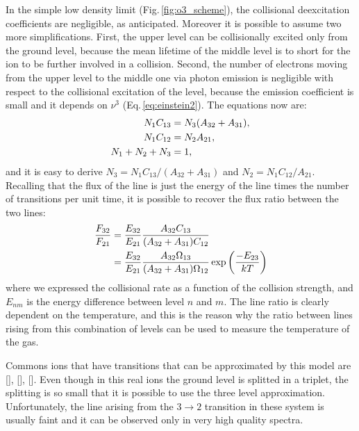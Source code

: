 \documentclass[../thesis.tex]{subfiles}
\begin{document}
In the simple low density limit (Fig.\,\ref{fig:o3_scheme}), the collisional deexcitation coefficients are negligible, as anticipated.
Moreover it is possible to assume two more simplifications.
First, the upper level can be collisionally excited only from the ground level, because the mean lifetime of the middle level is to short for the ion to be further involved in a collision.
Second, the number of electrons moving from the upper level to the middle one via photon emission is negligible with respect to the collisional excitation of the level, because the emission coefficient is small and it depends on $\nu^3$ (Eq.\,\ref{eq:einstein2}).
The equations now are:
\begin{align}
    \label{eq:lowdensity_equilibrium}
    N_1 C_{13} &= N_3(A_{32}+A_{31}), \notag\\
    N_1 C_{12} &= N_2A_{21},\\
    N_1+N_2+N_3 &= 1, \notag
\end{align}
and it is easy to derive $N_3 = N_1C_{13}/(A_{32}+A_{31})$ and $N_2= N_1C_{12}/A_{21}$.
Recalling that the flux of the line is just the energy of the line times the number of transitions per unit time, it is possible to recover the flux ratio between the two lines:
\begin{align}
    \label{eq:flux_forbidden1}
    \frac{F_{32}}{F_{21}} &= \frac{E_{32}}{E_{21}}\frac{A_{32}C_{13}}{(A_{32}+A_{31})C_{12}}\\
    & = \frac{E_{32}}{E_{21}}\frac{A_{32}\Omega_{13}}{(A_{32}+A_{31})\Omega_{12}}\exp \left(\frac{-E_{23}}{kT}\right) \notag
\end{align}
where we expressed the collisional rate as a function of the collision strength, and $E_{nm}$ is the energy difference between level $n$ and $m$.
The line ratio is clearly dependent on the temperature, and this is the reason why the ratio between lines rising from this combination of levels can be used to measure the temperature of the gas.

Commons ions that have transitions that can be approximated by this model are [], [], [].
Even though in this real ions the ground level is splitted in a triplet, the splitting is so small that it is possible to use the three level approximation.
Unfortunately, the line arising from the $3\to2$ transition in these system is usually faint and it can be observed only in very high quality spectra.
\end{document}
